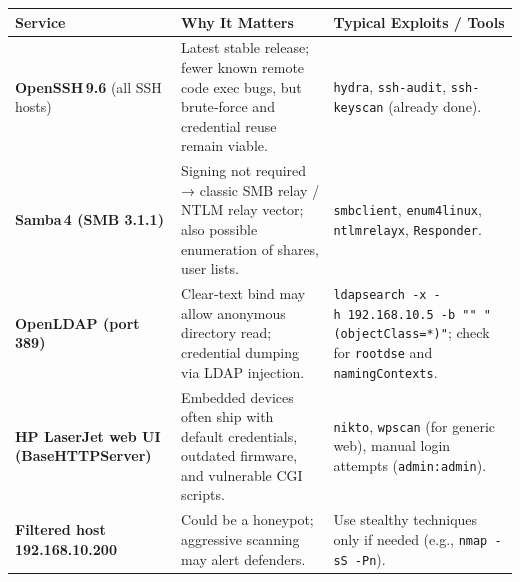 \begin{longtable}[]{@{}
        >{\raggedright\arraybackslash}p{}
        >{\raggedright\arraybackslash}p{}
        >{\raggedright\arraybackslash}p{}@{}}
    \toprule\noalign{}
    \begin{minipage}[b]{\linewidth}
                \raggedright
            Service
    \end{minipage} & \begin{minipage}[b]{\linewidth}
                                 \raggedright
                             Why It Matters
    \end{minipage} & \begin{minipage}[b]{\linewidth}
                                 \raggedright
                             Typical Exploits / Tools
    \end{minipage} \\
    \midrule\noalign{}
    \endhead
    \bottomrule\noalign{}
    \endlastfoot
    \textbf{OpenSSH\,9.6} (all SSH hosts) & Latest stable release; fewer
    known remote code exec bugs, but brute‑force and credential reuse remain
    viable. & \texttt{hydra}, \texttt{ssh-audit}, \texttt{ssh-keyscan}
    (already done). \\
    \textbf{Samba\,4 (SMB 3.1.1)} & Signing not required → classic SMB relay
    / NTLM relay vector; also possible enumeration of shares, user lists. &
    \texttt{smbclient}, \texttt{enum4linux}, \texttt{ntlmrelayx},
    \texttt{Responder}. \\
    \textbf{OpenLDAP (port\,389)} & Clear‑text bind may allow anonymous
    directory read; credential dumping via LDAP injection. &
    \texttt{ldapsearch\ -x\ -h\ 192.168.10.5\ -b\ ""\ "(objectClass=*)"};
    check for \texttt{rootdse} and \texttt{namingContexts}. \\
    \textbf{HP LaserJet web UI (BaseHTTPServer)} & Embedded devices often
    ship with default credentials, outdated firmware, and vulnerable CGI
    scripts. & \texttt{nikto}, \texttt{wpscan} (for generic web), manual
    login attempts (\texttt{admin:admin}). \\
    \textbf{Filtered host 192.168.10.200} & Could be a honeypot; aggressive
    scanning may alert defenders. & Use stealthy techniques only if needed
    (e.g., \texttt{nmap\ -sS\ -Pn}). \\
\end{longtable}

